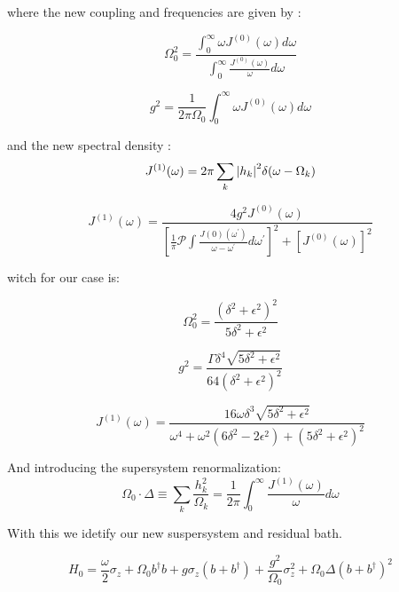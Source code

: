 \documentclass[reprint,aps,onecolumn,pra,notitlepage,nofootinbib]{revtex4-1}
\theoremstyle{definition}
\numberwithin{equation}{section}
\begin{document}
where the new coupling and frequencies are given by :

\begin{equation}\Omega_{0}^{2}=\frac{\int_{0}^{\infty} \omega J^{(0)}(\omega) d \omega}{\int_{0}^{\infty} \frac{J^{(0)}(\omega)}{\omega} d \omega}\end{equation}



\begin{equation}g^{2}=\frac{1}{2 \pi \Omega_{0}} \int_{0}^{\infty} \omega J^{(0)}(\omega) d \omega\end{equation}

and  the new spectral density :
\begin{equation}
    J^{(1)}(\omega) = 2 \pi \sum_{k} \abs{h_k}^2 \delta(\omega-\Omega_k)
\end{equation}

\begin{equation}J^{(1)}(\omega)=\frac{4 g^{2} J^{(0)}(\omega)}{\left[\frac{1}{\pi} \mathcal{P} \int \frac{J(0)\left(\omega^{\prime}\right)}{\omega-\omega^{\prime}} d \omega^{\prime}\right]^{2}+\left[J^{(0)}(\omega)\right]^{2}}\end{equation}

witch for our case is: 

\begin{equation}
\Omega_{0}^{2}=\frac{\left(\delta^{2}+\epsilon^{2}\right)^{2}}{5 \delta^{2}+\epsilon^{2}}
\end{equation}

\begin{equation}
g^{2}=\frac{\Gamma \delta^{4} \sqrt{5 \delta^{2}+\epsilon^{2}}}{64\left(\delta^{2}+\epsilon^{2}\right)^{2}}
\end{equation}

\begin{equation}
J^{(1)}(\omega)=\frac{16 \omega \delta^{3} \sqrt{5 \delta^{2}+\epsilon^{2}}}{\omega^{4}+\omega^{2}\left(6 \delta^{2}-2 \epsilon^{2}\right)+\left(5 \delta^{2}+\epsilon^{2}\right)^{2}}
\end{equation}

 And introducing the supersystem renormalization: 
$$
\Omega_{0} \cdot \Delta \equiv \sum_{k} \frac{h_{k}^{2}}{\Omega_{k}}=\frac{1}{2 \pi} \int_{0}^{\infty} \frac{J^{(1)}(\omega)}{\omega} d \omega
$$

With this we idetify our new suspersystem and residual bath. 




\begin{equation}
    H_0= \frac{\omega}{2} \sigma_z +  \Omega_0 b ^{\dagger} b +g \sigma_z  \left( b + b ^{\dagger} \right) + \frac{g^2}{\Omega_0} \sigma_z^2 + \Omega_0 \Delta \left( b + b ^{\dagger} \right)^2
\end{equation}
\end{document}
